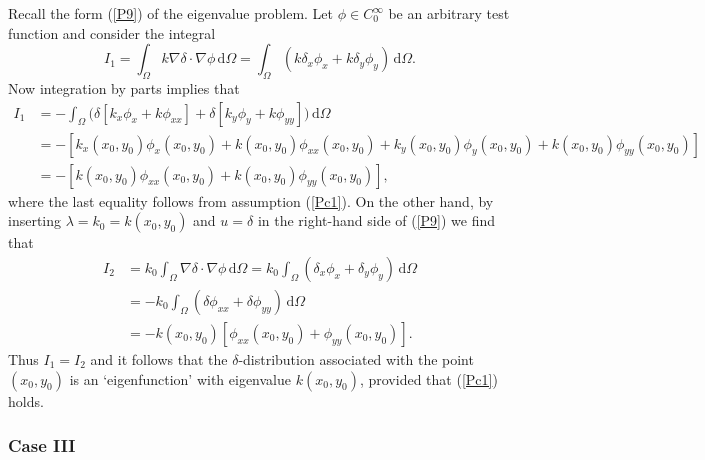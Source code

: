 \documentclass{imanum}
\begin{document}
Recall the form (\ref{P9}) of the eigenvalue problem. Let
$\phi \in C^\infty_0$ be an arbitrary test function and consider
the integral
\begin{equation*}
I_1 = \int_\Omega k \nabla \delta \cdot \nabla \phi\, \mathrm{d} \Omega =
\int_\Omega ( k \delta_x \phi_x + k \delta_y \phi_y ) \,
\mathrm{d} \Omega.
\end{equation*}
Now integration by parts implies that
\begin{align*}
I_1 &= - \int_\Omega (\delta [k_x \phi_x+k \phi_{xx}]
+ \delta [k_y \phi_y+k \phi_{yy}]{)} \, \mathrm{d} \Omega \\[3pt]
&= - [k_x(x_0,y_0) \phi_x(x_0,y_0)+k(x_0,y_0) \phi_{xx}(x_0,y_0)
+ k_y(x_0,y_0) \phi_y(x_0,y_0)+k(x_0,y_0) \phi_{yy}(x_0,y_0)] \\[3pt]
&= - [k(x_0,y_0) \phi_{xx}(x_0,y_0)+k(x_0,y_0) \phi_{yy}(x_0,y_0)],
\end{align*}
where the last equality follows from assumption (\ref{Pc1}).
On the other hand, by inserting $\lambda=k_0=k(x_0,y_0)$ and $u=\delta$
in the right-hand side of (\ref{P9}) we find that
\begin{align*}
I_2 &= k_0 \int_\Omega \nabla \delta \cdot \nabla \phi \,
\mathrm{d} \Omega
= k_0 \int_\Omega (\delta_x \phi_x + \delta_y \phi_y) \,
\mathrm{d} \Omega \\[3pt]
&= - k_0 \int_\Omega (\delta \phi_{xx} + \delta \phi_{yy}) \,
\mathrm{d} \Omega\\[3pt]
&= - k(x_0,y_0) [\phi_{xx}(x_0,y_0)+ \phi_{yy}(x_0,y_0)].
\end{align*}
Thus $I_1=I_2$ and it follows that the $\delta$-distribution associated
with the point $(x_0,y_0)$ is an `eigenfunction' with eigenvalue
$k(x_0,y_0)$, provided that (\ref{Pc1}) holds.


\subsubsection{Case III}
\label{sec4.2.3}
\end{document}

